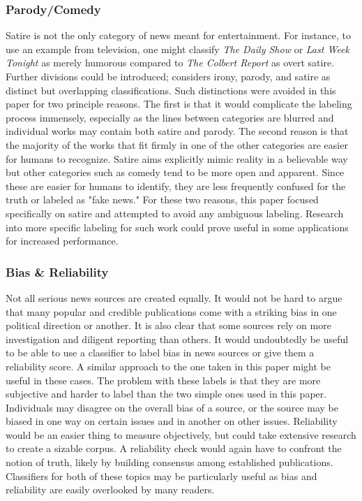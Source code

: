 \documentclass [12 pt] {report}
\begin{document}
\subsubsection*{Parody/Comedy}
Satire is not the only category of news meant for entertainment. For instance, to use an example from television, one might classify \textit{The Daily Show} or \textit{Last Week Tonight} as merely humorous compared to \textit{The Colbert Report} as overt satire. Further divisions could be introduced; \cite{digHumanities} considers irony, parody, and satire as distinct but overlapping classifications. Such distinctions were avoided in this paper for two principle reasons. The first is that it would complicate the labeling process immensely, especially as the lines between categories are blurred and individual works may contain both satire and parody. The second reason is that the majority of the works that fit firmly in one of the other categories are easier for humans to recognize. Satire aims explicitly mimic reality in a believable way but other categories such as comedy tend to be more open and apparent. Since these are easier for humans to identify, they are less frequently confused for the truth or labeled as "fake news." For these two reasons, this paper focused specifically on satire and attempted to avoid any ambiguous labeling. Research into more specific labeling for such work could prove useful in some applications for increased performance.

\subsubsection*{Bias \& Reliability}
Not all serious news sources are created equally. It would not be hard to argue that many popular and credible publications come with a striking bias in one political direction or another. It is also clear that some sources rely on more investigation and diligent reporting than others. It would undoubtedly be useful to be able to use a classifier to label bias in news sources or give them a reliability score. A similar approach to the one taken in this paper might be useful in these cases. The problem with these labels is that they are more subjective and harder to label than the two simple ones used in this paper. Individuals may disagree on the overall bias of a source, or the source may be biased in one way on certain issues and in another on other issues. Reliability would be an easier thing to measure objectively, but could take extensive research to create a sizable corpus. A reliability check would again have to confront the notion of truth, likely by building consensus among established publications. Classifiers for both of these topics may be particularly useful as bias and reliability are easily overlooked by many readers.
\end{document}
